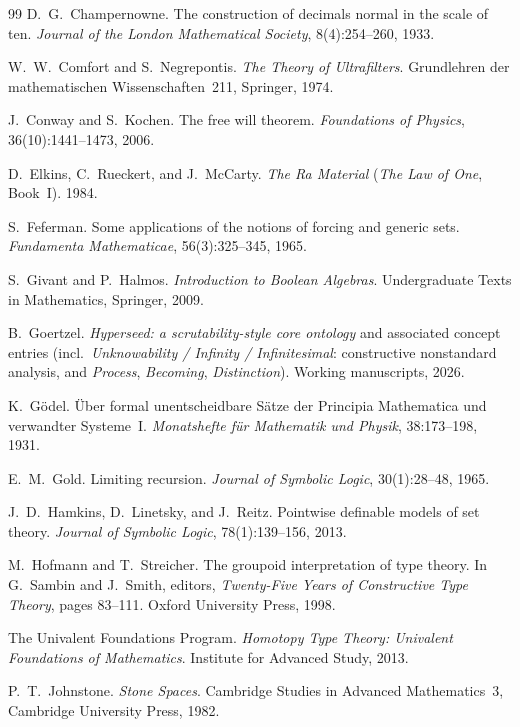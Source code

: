 \documentclass[]{article}
\theoremstyle{definition}
\theoremstyle{remark}
\begin{document}
\begin{thebibliography}{99}
 D.~G.~Champernowne. The construction of decimals normal in the scale of
ten. \emph{Journal of the London Mathematical Society}, 8(4):254--260, 1933.

 W.~W.~Comfort and S.~Negrepontis. \emph{The Theory of
Ultrafilters}. Grundlehren der mathematischen Wissenschaften~211, Springer, 1974.

 J.~Conway and S.~Kochen. The free will theorem. \emph{Foundations of
Physics}, 36(10):1441--1473, 2006.

 D.~Elkins, C.~Rueckert, and J.~McCarty. \emph{The Ra Material} (\emph{The Law of
One}, Book~I). 1984.

 S.~Feferman. Some applications of the notions of forcing and generic sets.
\emph{Fundamenta Mathematicae}, 56(3):325--345, 1965.

 S.~Givant and P.~Halmos. \emph{Introduction to Boolean Algebras}.
Undergraduate Texts in Mathematics, Springer, 2009.

 B.~Goertzel. \emph{Hyperseed: a scrutability-style core ontology} and
associated concept entries (incl.\ \emph{Unknowability / Infinity / Infinitesimal}: constructive
nonstandard analysis, and \emph{Process}, \emph{Becoming}, \emph{Distinction}). Working manuscripts,
2026.

 K.~G\"odel. \"Uber formal unentscheidbare S\"atze der Principia Mathematica und
verwandter Systeme~I. \emph{Monatshefte f\"ur Mathematik und Physik}, 38:173--198, 1931.

 E.~M.~Gold. Limiting recursion. \emph{Journal of Symbolic Logic}, 30(1):28--48,
1965.

 J.~D.~Hamkins, D.~Linetsky, and J.~Reitz. Pointwise definable models
of set theory. \emph{Journal of Symbolic Logic}, 78(1):139--156, 2013.

 M.~Hofmann and T.~Streicher. The groupoid interpretation of type
theory. In G.~Sambin and J.~Smith, editors, \emph{Twenty-Five Years of Constructive Type Theory},
pages 83--111. Oxford University Press, 1998.

 The Univalent Foundations Program. \emph{Homotopy Type Theory: Univalent
Foundations of Mathematics}. Institute for Advanced Study, 2013.

 P.~T.~Johnstone. \emph{Stone Spaces}. Cambridge Studies in Advanced
Mathematics~3, Cambridge University Press, 1982.


\end{thebibliography}
\end{document}
